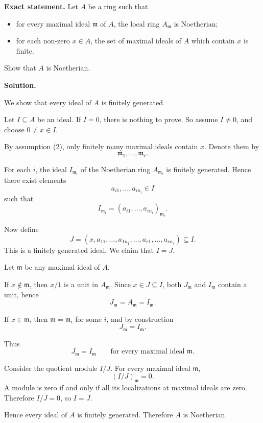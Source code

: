 \documentclass[12pt,a4paper]{article}
\theoremstyle{plain}
\theoremstyle{definition}      %
\begin{document}
	\textbf{Exact statement.}
	Let \(A\) be a ring such that
	\begin{itemize}
		\item[(1)] for every maximal ideal \(\mathfrak m\) of \(A\), the local ring \(A_{\mathfrak m}\) is Noetherian;
		\item[(2)] for each non-zero \(x\in A\), the set of maximal ideals of \(A\) which contain \(x\) is finite.
	\end{itemize}
	Show that \(A\) is Noetherian.
	
	\textbf{Solution.}
	
	We show that every ideal of \(A\) is finitely generated.
	
	Let \(I\subseteq A\) be an ideal. If \(I=0\), there is nothing to prove. So assume \(I\neq 0\), and choose \(0\neq x\in I\).
	
	By assumption (2), only finitely many maximal ideals contain \(x\). Denote them by
	\[
	\mathfrak m_1,\dots,\mathfrak m_r.
	\]
	
	For each \(i\), the ideal \(I_{\mathfrak m_i}\) of the Noetherian ring \(A_{\mathfrak m_i}\) is finitely generated. Hence there exist elements
	\[
	a_{i1},\dots,a_{in_i}\in I
	\]
	such that
	\[
	I_{\mathfrak m_i}=(a_{i1},\dots,a_{in_i})_{\mathfrak m_i}.
	\]
	
	Now define
	\[
	J=(x,a_{11},\dots,a_{1n_1},\dots,a_{r1},\dots,a_{rn_r})\subseteq I.
	\]
	This is a finitely generated ideal. We claim that \(I=J\).
	
	Let \(\mathfrak m\) be any maximal ideal of \(A\).
	
	If \(x\notin \mathfrak m\), then \(x/1\) is a unit in \(A_{\mathfrak m}\). Since \(x\in J\subseteq I\), both \(J_{\mathfrak m}\) and \(I_{\mathfrak m}\) contain a unit, hence
	\[
	J_{\mathfrak m}=A_{\mathfrak m}=I_{\mathfrak m}.
	\]
	
	If \(x\in \mathfrak m\), then \(\mathfrak m=\mathfrak m_i\) for some \(i\), and by construction
	\[
	J_{\mathfrak m}=I_{\mathfrak m}.
	\]
	
	Thus
	\[
	J_{\mathfrak m}=I_{\mathfrak m}
	\qquad \text{for every maximal ideal } \mathfrak m.
	\]
	
	Consider the quotient module \(I/J\). For every maximal ideal \(\mathfrak m\),
	\[
	(I/J)_{\mathfrak m}=0.
	\]
	A module is zero if and only if all its localizations at maximal ideals are zero. Therefore \(I/J=0\), so \(I=J\).
	
	Hence every ideal of \(A\) is finitely generated. Therefore \(A\) is Noetherian.
	
\end{document}
